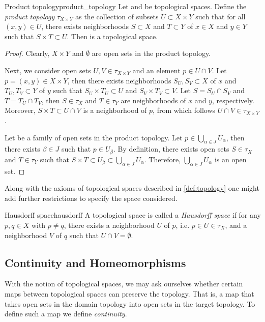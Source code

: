 \begin{proposition}{Product topology}{product_topology}
    Let  and  be topological spaces. Define the \emph{product topology} \(\tau_{X\times Y}\) as the collection of subsets \(U \subset X \times Y\) such that for all \((x,y) \in U\), there exists neighborhoods \(S \subset X\) and \(T \subset Y\) of \(x \in X\) and \(y\in Y\) such that \(S \times T \subset U\). Then  is a topological space.
\end{proposition}
\begin{proof}
    Clearly, \(X\times Y\) and \(\emptyset\) are open sets in the product topology.

    Next, we consider open sets \(U, V \in \tau_{X\times Y}\) and an element \(p \in U \cap V\). Let \(p = (x, y) \in X \times Y\), then there exists neighborhoods \(S_U, S_V\subset X\) of \(x\) and \(T_U, T_V \subset Y\) of \(y\) such that \(S_U \times T_U \subset U\) and \(S_V \times T_V \subset V\). Let \(S = S_U \cap S_V\) and \(T = T_U \cap T_V\), then \(S \in \tau_X\) and \(T \in \tau_Y\) are neighborhoods of \(x\) and \(y\), respectively. Moreover, \(S \times T \subset U \cap V\) is a neighborhood of \(p\), from which follows \(U \cap V \in \tau_{X\times Y}\).

    Let  be a family of open sets in the product topology. Let \(p\in \bigcup_{\alpha\in J}U_\alpha\), then there exists \(\beta \in J\) such that \(p \in U_{\beta}\). By definition, there exists open sets \(S \in \tau_X\) and \(T \in \tau_Y\) such that \(S \times T \subset U_\beta \subset \bigcup_{\alpha\in J} U_\alpha\). Therefore, \(\bigcup_{\alpha\in J}U_\alpha\) is an open set.
\end{proof}

Along with the axioms of topological spaces described in \cref{def:topology} one might add further restrictions to specify the space considered.
\begin{definition}{Hausdorff space}{hausdorff}
    A topological space  is called a \emph{Hausdorff space} if for any \(p,q\in X\) with \(p\neq q\), there exists a neighborhood \(U\) of \(p\), i.e. \(p \in U \in \tau_X\), and a neighborhood \(V\) of \(q\) such that \(U \cap V = \emptyset\).
\end{definition}

\subsection{Continuity and Homeomorphisms}
With the notion of topological spaces, we may ask ourselves whether certain maps between topological spaces can preserve the topology. That is, a map that takes open sets in the domain topology into open sets in the target topology. To define such a map we define \emph{continuity}.

